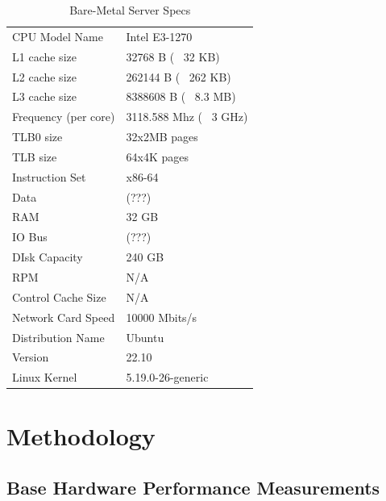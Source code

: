 \documentclass{article}
\begin{document}
\begin{table}[h]
    \centering
    \caption{Bare-Metal Server Specs}
	\begin{tabularx}{\linewidth}{ll}
		\toprule
        CPU Model Name & Intel E3-1270 \\
        L1 cache size & 32768 B (~ 32 KB) \\
        L2 cache size & 262144 B (~ 262 KB) \\
        L3 cache size & 8388608 B (~ 8.3 MB) \\
        Frequency (per core) & 3118.588 Mhz (~ 3 GHz) \\
        TLB0 size & 32x2MB pages \\
        TLB size & 64x4K pages \\
        \midrule

        Instruction Set & x86-64 \\
        Data & (???)  \\
        RAM & 32 GB \\
        IO Bus & (???) \\    

        \midrule
        DIsk Capacity & 240 GB \\
        RPM & N/A \\ %
        Control Cache Size & N/A \\ %

        \midrule
        Network Card Speed & 10000 Mbits/s \\

        \midrule
        Distribution Name & Ubuntu  \\
        Version & 22.10 \\
        Linux Kernel & 5.19.0-26-generic \\
        \bottomrule
	\end{tabularx}
    \label{fig:mach_specs}
\end{table}

\section{Methodology}

\subsection{Base Hardware Performance Measurements}
\end{document}
